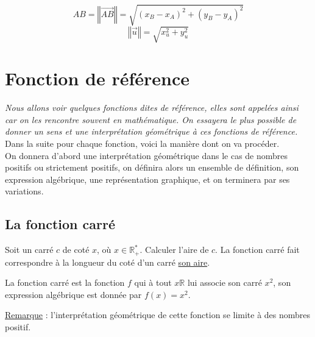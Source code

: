 \documentclass[french]{book}
\newcommand{\norme}[1]{\left\Vert #1\right\Vert}
\begin{document}
 
\begin{prop}
$$AB=\norme{\overrightarrow{AB}}=\sqrt{(x_B-x_A)^2+(y_B-y_A)^2}$$
$$\norme{\overrightarrow{u}}=\sqrt{x_{u}^2+y_{u}^2}$$
\end{prop}

\chapter{Fonction de référence}
\textit{Nous allons voir quelques fonctions dites de référence, elles sont appelées ainsi car on les rencontre souvent en mathématique. On essayera le plus possible de donner un sens et une interprétation géométrique à ces fonctions de référence. } \\

Dans la suite pour chaque fonction, voici la manière dont on va procéder.\\

On donnera d'abord une interprétation géométrique dans le cas de nombres positifs ou strictement positifs, on définira alors un ensemble de définition, son expression algébrique, une représentation graphique, et on terminera par ses variations. 

\section{La fonction carré}
Soit un carré $c$ de coté $x$, où $x \in \mathbb{R}_+^*$. Calculer l'aire de $c$.
La fonction carré fait correspondre à la longueur du coté d'un carré \underline{son aire}.

\begin{defn}
La fonction carré est la fonction $f$ qui à tout $x \mathbb{R}$ lui associe son carré $x^2$, son expression algébrique est donnée par $f(x)=x^2$.\\
\end{defn}

\underline{Remarque} : l'interprétation géométrique de cette fonction se limite à des nombres positif.\\
\end{document}
